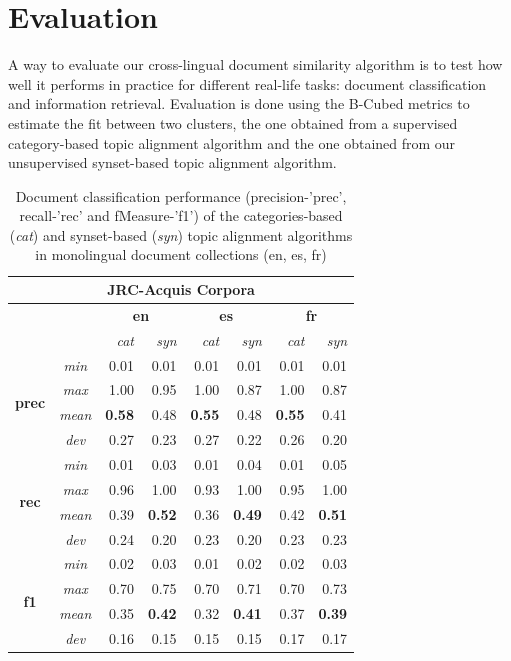 \section{Evaluation}
\label{sec:crosslingual-evaluation}

A way to evaluate our cross-lingual document similarity algorithm is to test how well it performs in practice for different real-life tasks: document classification and information retrieval. Evaluation is done using the B-Cubed metrics \citep{Bagga1998} to estimate the fit between two clusters, the one obtained from a supervised category-based topic alignment algorithm and the one obtained from our unsupervised synset-based topic alignment algorithm. 

\begin{table}[ht]\centering
\begin{center}
\small
\begin{tabular}{cc|rr||rr||rr}
    \hline
    \multicolumn{8}{c}{\textbf{JRC-Acquis Corpora}} \\
    \hline
    & & \multicolumn{2}{c}{\textbf{en}} &
      \multicolumn{2}{c}{\textbf{es}} &
      \multicolumn{2}{c}{\textbf{fr}} \\
    & & {\textit{cat}} & {\textit{syn}} & {\textit{cat}} & {\textit{syn}} & {\textit{cat}} & {\textit{syn}} \\
    \hline
    \multirow{4}{*}{\textbf{prec}} 
    &{\textit{min}}     &0.01 &0.01 &0.01 &0.01 &0.01 &0.01 \\
    &{\textit{max}}     &1.00 &0.95 &1.00 &0.87 &1.00 &0.87 \\
    &{\textit{mean}}    &\textbf{0.58} &0.48 &\textbf{0.55} &0.48 &\textbf{0.55} &0.41 \\
    &{\textit{dev}}     &0.27 &0.23 &0.27 &0.22 &0.26 &0.20 \\
    \hline
    \multirow{4}{*}{\textbf{rec}} 
    &{\textit{min}}     &0.01 &0.03 &0.01 &0.04 &0.01 &0.05 \\
    &{\textit{max}}     &0.96 &1.00 &0.93 &1.00 &0.95 &1.00 \\
    &{\textit{mean}}    &0.39 &\textbf{0.52} &0.36 &\textbf{0.49} &0.42 &\textbf{0.51} \\
    &{\textit{dev}}     &0.24 &0.20 &0.23 &0.20 &0.23 &0.23 \\
    \hline
    \multirow{4}{*}{\textbf{f1}} 
    &{\textit{min}}     &0.02 &0.03 &0.01 &0.02 &0.02 &0.03 \\
    &{\textit{max}}     &0.70 &0.75 &0.70 &0.71 &0.70 &0.73 \\
    &{\textit{mean}}    &0.35 &\textbf{0.42} &0.32 &\textbf{0.41} &0.37 &\textbf{0.39} \\
    &{\textit{dev}}     &0.16 &0.15 &0.15 &0.15 &0.17 &0.17 \\
\end{tabular}
\end{center}
\caption{Document classification performance (precision-'prec', recall-'rec' and fMeasure-'f1') of the categories-based (\textit{cat}) and synset-based (\textit{syn}) topic alignment algorithms in monolingual document collections (en, es, fr)}
\label{tb:mono-class}
\end{table}


